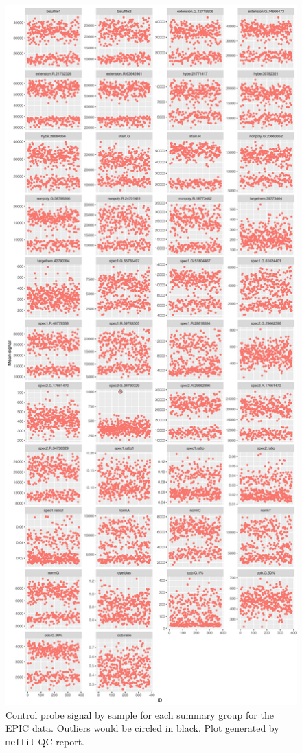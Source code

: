 \documentclass[
]{book}
\begin{document}
\begin{figure}

{\centering \includegraphics[width=0.8\linewidth]{figs/MAVIDOS-II-qcEPICctrlProbes} 

}

\caption{Control probe signal by sample for each summary group for the EPIC data. Outliers would be circled in black. Plot generated by \texttt{meffil} QC report.}\label{fig:MAVIDOSIIqcEPICctrlProbes}
\end{figure}
\end{document}
